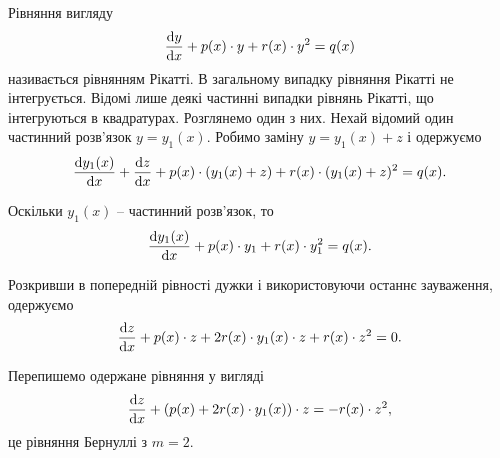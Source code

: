 Рівняння вигляду 
\begin{equation*}
	\frac{\mathop{}\!\mathrm{d} y}{\mathop{}\!\mathrm{d} x} + p(x) \cdot y + r(x) \cdot y^2 = q(x)
\end{equation*} 
називається рівнянням Рікатті. В загальному випадку рівняння Рікатті не інтегрується. Відомі лише деякі частинні випадки рівнянь Рікатті, що інтегруються в квадратурах. Розглянемо один з них. Нехай відомий один частинний розв’язок $y = y_1(x)$. Робимо заміну $y = y_1(x) + z$ і одержуємо
\begin{equation*}
	\frac{\mathop{}\!\mathrm{d} y_1(x)}{\mathop{}\!\mathrm{d} x} + \frac{\mathop{}\!\mathrm{d} z}{\mathop{}\!\mathrm{d} x} + p(x) \cdot (y_1(x) + z) + r(x) \cdot (y_1(x) + z)^2 = q(x).
\end{equation*}

Оскільки $y_1(x)$ -- частинний розв’язок, то
\begin{equation*}
	\frac{\mathop{}\!\mathrm{d} y_1(x)}{\mathop{}\!\mathrm{d} x} + p(x) \cdot y_1 + r(x) \cdot y_1^2 = q(x).
\end{equation*}

Розкривши в попередній рівності дужки і використовуючи останнє зауваження, одержуємо
\begin{equation*}
	\frac{\mathop{}\!\mathrm{d} z}{\mathop{}\!\mathrm{d} x} + p(x) \cdot z + 2 r(x) \cdot y_1(x) \cdot z + r(x) \cdot z^2 = 0.
\end{equation*}

Перепишемо одержане рівняння у вигляді
\begin{equation*}
	\frac{\mathop{}\!\mathrm{d} z}{\mathop{}\!\mathrm{d} x} + \left(p(x) + 2 r(x) \cdot y_1(x)\right) \cdot z = - r(x) \cdot z^2 ,
\end{equation*}
це рівняння Бернуллі з $m = 2$.
